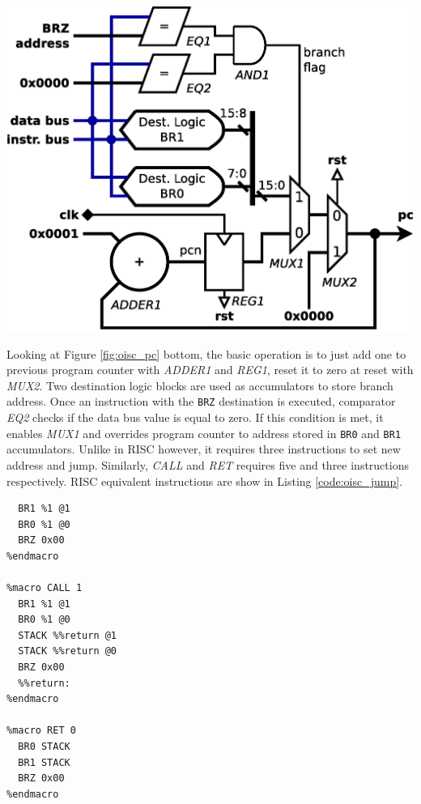 \begin{colfigure}
	\centering
	\includegraphics[width=\linewidth]{../resources/oisc_pc.eps}
	\label{fig:oisc_pc}
\end{colfigure}

Looking at Figure \ref{fig:oisc_pc} bottom, the basic operation is to just add one to previous program counter with \textit{ADDER1} and \textit{REG1}, reset it to zero at reset with \textit{MUX2}. Two destination logic blocks are used as accumulators to store branch address. Once an instruction with the \texttt{BRZ} destination is executed, comparator \textit{EQ2} checks if the data bus value is equal to zero. If this condition is met, it enables \textit{MUX1} and overrides program counter to address stored in \texttt{BR0} and \texttt{BR1} accumulators. Unlike in RISC however, it requires three instructions to set new address and jump. Similarly, \textit{CALL} and \textit{RET} requires five and three instructions respectively. RISC equivalent instructions are show in Listing \ref{code:oisc_jump}.

\begin{blockpage}
	\begin{lstlisting}[frame=single, emph={JUMP, CALL, RET, return}, label=code:oisc_jump, caption={OISC assembly code emulating RISC \texttt{JUMP}, \texttt{CALL} and \texttt{RET} instructions.}]
%macro JUMP 1
  BR1 %1 @1
  BR0 %1 @0
  BRZ 0x00
%endmacro

%macro CALL 1
  BR1 %1 @1
  BR0 %1 @0
  STACK %%return @1
  STACK %%return @0
  BRZ 0x00
  %%return:
%endmacro

%macro RET 0
  BR0 STACK
  BR1 STACK
  BRZ 0x00
%endmacro
	\end{lstlisting}
\end{blockpage}


